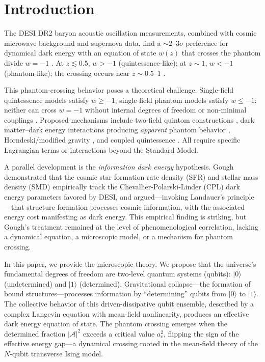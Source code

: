 \documentclass[aps,prd,twocolumn,superscriptaddress]{revtex4-2}
\begin{document}
\section{Introduction}

The DESI DR2 baryon acoustic oscillation measurements, combined with cosmic microwave background and supernova data, find a $\sim 2$--$3\sigma$ preference for dynamical dark energy with an equation of state $w(z)$ that crosses the phantom divide $w=-1$ \cite{DESI:2025}. At $z \lesssim 0.5$, $w > -1$ (quintessence-like); at $z \sim 1$, $w < -1$ (phantom-like); the crossing occurs near $z \sim 0.5$--$1$ \cite{Li:2025,Pang:2025}.

This phantom-crossing behavior poses a theoretical challenge. Single-field quintessence models satisfy $w \ge -1$; single-field phantom models satisfy $w \le -1$; neither can cross $w=-1$ without internal degrees of freedom \cite{Hu:2005} or non-minimal couplings \cite{Linder:2024}. Proposed mechanisms include two-field quintom constructions \cite{Feng:2005}, dark matter--dark energy interactions producing \emph{apparent} phantom behavior \cite{Khoury:2025,Guedezounme:2026}, Horndeski/modified gravity \cite{Linder:2025,Cataneo:2025}, and coupled quintessence \cite{Andriot:2025,Chen:2026}. All require specific Lagrangian terms or interactions beyond the Standard Model.

A parallel development is the \emph{information dark energy} hypothesis. Gough \cite{Gough:2025} demonstrated that the cosmic star formation rate density (SFR) and stellar mass density (SMD) empirically track the Chevallier-Polarski-Linder (CPL) dark energy parameters favored by DESI, and argued---invoking Landauer's principle \cite{Landauer:1961}---that structure formation processes cosmic information, with the associated energy cost manifesting as dark energy. This empirical finding is striking, but Gough's treatment remained at the level of phenomenological correlation, lacking a dynamical equation, a microscopic model, or a mechanism for phantom crossing.

In this paper, we provide the microscopic theory. We propose that the universe's fundamental degrees of freedom are two-level quantum systems (qubits): $|0\rangle$ (undetermined) and $|1\rangle$ (determined). Gravitational collapse---the formation of bound structures---processes information by ``determining'' qubits from $|0\rangle$ to $|1\rangle$. The collective behavior of this driven-dissipative qubit ensemble, described by a complex Langevin equation with mean-field nonlinearity, produces an effective dark energy equation of state. The phantom crossing emerges when the determined fraction $|\mathcal{A}|^2$ exceeds a critical value $a_c^2$, flipping the sign of the effective energy gap---a dynamical crossing rooted in the mean-field theory of the $N$-qubit transverse Ising model.
\end{document}
